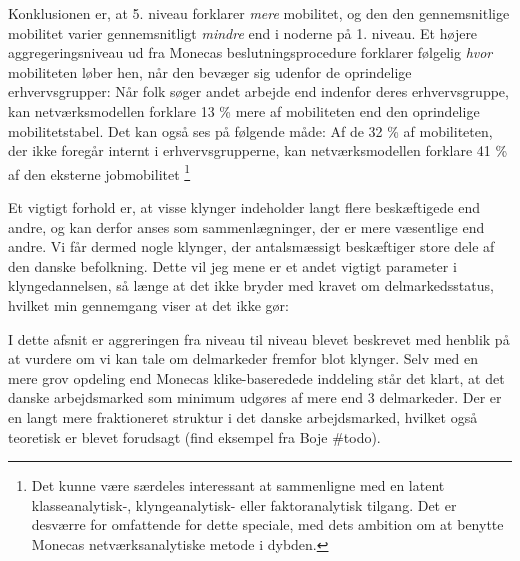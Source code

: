 Konklusionen er, at 5. niveau forklarer \emph{mere} mobilitet, og den den gennemsnitlige mobilitet varier gennemsnitligt \emph{mindre} end i noderne på 1. niveau. Et højere aggregeringsniveau ud fra Monecas beslutningsprocedure forklarer følgelig \emph{hvor} mobiliteten løber hen, når den bevæger sig udenfor de oprindelige erhvervsgrupper: Når folk søger andet arbejde end indenfor deres erhvervsgruppe, kan netværksmodellen forklare 13 \% mere af mobiliteten end den oprindelige mobilitetstabel. Det kan også ses på følgende måde: Af de 32 \% af mobiliteten, der ikke foregår internt i erhvervsgrupperne, kan netværksmodellen forklare 41 \% af den eksterne jobmobilitet%
%
\footnote{ Det kunne være særdeles interessant at sammenligne med en latent klasseanalytisk-, klyngeanalytisk- eller faktoranalytisk tilgang. Det er desværre for omfattende for dette speciale, med dets ambition om at benytte Monecas netværksanalytiske metode i dybden.}
%



Et vigtigt forhold er, at visse klynger indeholder langt flere beskæftigede end andre, og kan derfor anses som sammenlægninger, der er mere væsentlige end andre. Vi får dermed nogle klynger, der antalsmæssigt beskæftiger store dele af den danske befolkning. Dette vil jeg mene er et andet vigtigt parameter i klyngedannelsen, så længe at det ikke bryder med kravet om delmarkedsstatus, hvilket min gennemgang viser at det ikke gør: 


I dette afsnit er aggreringen fra niveau til niveau blevet beskrevet med henblik på at vurdere om vi kan tale om delmarkeder fremfor blot klynger. Selv med en mere grov opdeling end Monecas klike-baseredede inddeling står det klart, at det danske arbejdsmarked som minimum udgøres af mere end 3 delmarkeder.  Der er en langt mere fraktioneret struktur i det danske arbejdsmarked, hvilket også teoretisk er blevet forudsagt (find eksempel fra Boje \#todo). 


